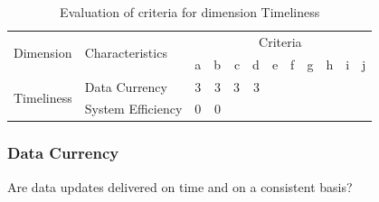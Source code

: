 \begin{table}[htbp]
    \centering

    \begin{tabular}{llrrrrrrrrrr}
        \toprule
        \multirow{2}{*}{Dimension}  & \multirow{2}{*}{Characteristics}  & \multicolumn{10}{c}{Criteria}         \\ \cmidrule(lr){3-12}
                                    &                                   & a & b & c & d & e & f & g & h & i & j \\ \midrule
        \multirow{2}{*}{Timeliness} & Data Currency                     & 3 & 3 & 3 & 3 &   &   &   &   &   &   \\
                                    & System Efficiency                 & 0 & 0 &   &   &   &   &   &   &   &   \\
        \bottomrule
    \end{tabular}

    \caption{Evaluation of criteria for dimension Timeliness}
    \label{table:timeliness-benchmark}
\end{table}
\FloatBarrier

\subsubsection{Data Currency}

Are data updates delivered on time and on a consistent basis?

